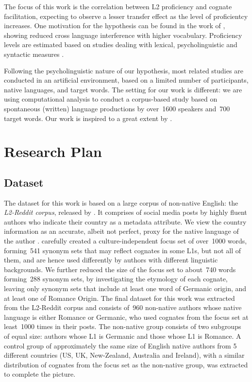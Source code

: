 \documentclass[11pt]{article}
\begin{document}
The focus of this work is the correlation between L2 proficiency and cognate facilitation, expecting to observe a lesser transfer effect as the level of proficientcy increases. One motivation for the hypothesis can be found in the work of \cite{Prior-etal:2017}, showing reduced  cross language interference with higher vocabulary.
 Proficiency levels are estimated based on studies dealing with lexical, psycholinguistic and syntactic measures \citep{Kuperman2012,LuAi2015,kyle2015automatically}.

Following the psycholinguistic nature of our hypothesis, most related studies are conducted in an artificial environment, based on a limited number of participants, native languages, and target words. The setting for our work is different: we are using computational analysis to conduct a corpus-based study based on spontaneous (written) language productions by over~1600 speakers and~700 target words. Our work is inspired to a great extent by \citet{TACL1403}.


\section{Research Plan}

\subsection{Dataset}
\label{sec:dataset}

The dataset for this work is based on a large corpus of non-native English: the \emph{L2-Reddit corpus}, released by \citet{TACL1403}. It comprises of social media posts by highly fluent authors who indicate their country as a metadata attribute.  We view the country information as an accurate, albeit not perfect, proxy for the native language of the author \citep{D18-1395}.  
\citet{TACL1403} carefully created  a culture-independent focus set of over~1000 words, forming~541 synonym sets that may reflect cognates in some L1s, but not all of them, and are hence used differently by authors with different linguistic backgrounds.
We further reduced the size of the focus set to about~740 words forming~288 synonym sets, by investigating the etymology of each cognate, leaving only synonym sets that include at least one word of Germanic origin, and at least one of Romance Origin.
The final dataset for this work was extracted from the L2-Reddit corpus and consists of~960 non-native authors whose native language is either Romance or Germanic, who used cognates from the focus set at least~1000 times in their posts.
The non-native group consists of two subgroups of equal size:  authors whose L1 is Germanic and those whose L1 is Romance. 
A control group of approximately the same size of English native authors from 5 different countries (US, UK, New-Zealand, Australia and Ireland), with a similar distribution of cognates from the focus set as the non-native group, was extracted to complete the picture. 
\end{document}
